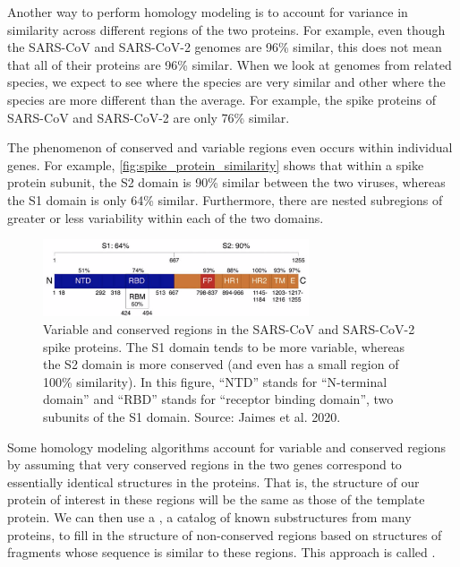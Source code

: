 Another way to perform homology modeling is to account for variance in similarity across different regions of the two proteins. For example, even though the SARS-CoV and SARS-CoV-2 genomes are 96\% similar, this does not mean that all of their proteins are 96\% similar. When we look at genomes from related species, we expect to see  where the species are very similar and other  where the species are more different than the average. For example, the spike proteins of SARS-CoV and SARS-CoV-2 are only 76\% similar.

The phenomenon of conserved and variable regions even occurs within individual genes. For example, \autoref{fig:spike_protein_similarity} shows that within a spike protein subunit, the S2 domain is 90\% similar between the two viruses, whereas the S1 domain is only 64\% similar. Furthermore, there are nested subregions of greater or less variability within each of the two domains.

\begin{figure}[h]
	\centering
	\mySfFamily
	\includegraphics[width = 0.7\textwidth]{../images/spike_protein_similarity.png}
	\caption{Variable and conserved regions in the SARS-CoV and SARS-CoV-2 spike proteins. The S1 domain tends to be more variable, whereas the S2 domain is more conserved (and even has a small region of 100\% similarity). In this figure, ``NTD'' stands for ``N-terminal domain'' and ``RBD'' stands for ``receptor binding domain'', two subunits of the S1 domain. Source: Jaimes et al. 2020.}
	\label{fig:spike_protein_similarity}
\end{figure}

Some homology modeling algorithms account for variable and conserved regions by assuming that very conserved regions in the two genes correspond to essentially identical structures in the proteins. That is, the structure of our protein of interest in these regions will be the same as those of the template protein. We can then use a , a catalog of known substructures from many proteins, to fill in the structure of non-conserved regions based on structures of fragments whose sequence is similar to these regions. This approach is called .

